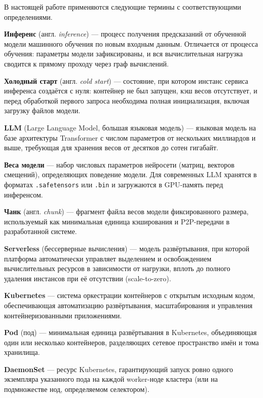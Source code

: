 
В настоящей работе применяются следующие термины с соответствующими определениями.

\textbf{Инференс} (англ. \textit{inference}) --- процесс получения предсказаний от обученной модели машинного обучения по новым входным данным. Отличается от процесса обучения: параметры модели зафиксированы, и вся вычислительная нагрузка сводится к прямому проходу через граф вычислений.

\textbf{Холодный старт} (англ. \textit{cold start}) --- состояние, при котором инстанс сервиса инференса создаётся с нуля: контейнер не был запущен, кэш весов отсутствует, и перед обработкой первого запроса необходима полная инициализация, включая загрузку файлов модели.

\textbf{LLM} (Large Language Model, большая языковая модель) --- языковая модель на базе архитектуры Transformer с числом параметров от нескольких миллиардов и выше, требующая для хранения весов от десятков до сотен гигабайт.

\textbf{Веса модели} --- набор числовых параметров нейросети (матриц, векторов смещений), определяющих поведение модели. Для современных LLM хранятся в форматах \texttt{.safetensors} или \texttt{.bin} и загружаются в GPU-память перед инференсом.

\textbf{Чанк} (англ. \textit{chunk}) --- фрагмент файла весов модели фиксированного размера, используемый как минимальная единица кэширования и P2P-передачи в разработанной системе.

\textbf{Serverless} (бессерверные вычисления) --- модель развёртывания, при которой платформа автоматически управляет выделением и освобождением вычислительных ресурсов в зависимости от нагрузки, вплоть до полного удаления инстансов при её отсутствии (scale-to-zero).

\textbf{Kubernetes} --- система оркестрации контейнеров с открытым исходным кодом, обеспечивающая автоматизацию развёртывания, масштабирования и управления контейнеризованными приложениями.

\textbf{Pod} (под) --- минимальная единица развёртывания в Kubernetes, объединяющая один или несколько контейнеров, разделяющих сетевое пространство имён и тома хранилища.

\textbf{DaemonSet} --- ресурс Kubernetes, гарантирующий запуск ровно одного экземпляра указанного пода на каждой worker-ноде кластера (или на подмножестве нод, определяемом селектором).

